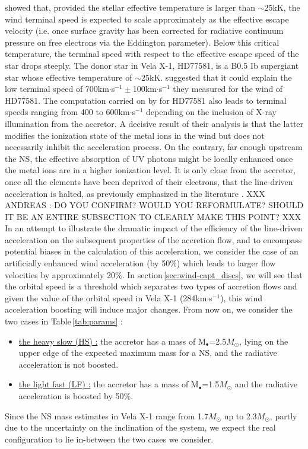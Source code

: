 \documentclass{aa}
\makeatletter
\newcommand*{\ns}{NS\@\xspace}
\newcommand*{\eg}{e.g.\@\xspace}
\newcommand*{\ie}{i.e.\@\xspace}
\newcommand*{\msun}{$M_{\odot}$\@\xspace}
\makeatother
\begin{document}
\cite{Vink2001} showed that, provided the stellar effective temperature is larger than $\sim$25kK, the wind terminal speed is expected to scale approximately as the effective escape velocity (\ie once surface gravity has been corrected for radiative continuum pressure on free electrons via the Eddington parameter). Below this critical temperature, the terminal speed with respect to the effective escape speed of the star drops steeply. The donor star in Vela X-1, HD77581, is a B0.5 Ib supergiant star \citep{Hiltner1972,Forman1973} whose effective temperature of $\sim$25kK. \cite{Gimenez-Garcia2016} suggested that it could explain the low terminal speed of 700km$\cdot$s$^{-1}\pm$100km$\cdot$s$^{-1}$ they measured for the wind of HD77581. The computation carried on by \cite{Sanders2017} for HD77581 also leads to terminal speeds ranging from 400 to 600km$\cdot$s$^{-1}$ depending on the inclusion of X-ray illumination from the accretor. A decisive result of their analysis is that the latter modifies the ionization state of the metal ions in the wind but does not necessarily inhibit the acceleration process. On the contrary, far enough upstream the \ns, the effective absorption of UV photons might be locally enhanced once the metal ions are in a higher ionization level. It is only close from the accretor, once all the elements have been deprived of their electrons, that the line-driven acceleration is halted, as previously emphasized in the literature \citep[see \eg][]{Blondin1990a}. XXX ANDREAS : DO YOU CONFIRM? WOULD YOU REFORMULATE? SHOULD IT BE AN ENTIRE SUBSECTION TO CLEARLY MAKE THIS POINT? XXX In an attempt to illustrate the dramatic impact of the efficiency of the line-driven acceleration on the subsequent properties of the accretion flow, and to encompass potential biases in the calculation of this acceleration, we consider the case of an artificially enhanced wind acceleration (by 50\%) which leads to larger flow velocities by approximately 20\%. In section\,\ref{sec:wind-capt_discs}, we will see that the orbital speed is a threshold which separates two types of accretion flows and given the value of the orbital speed in Vela X-1 (284km$\cdot$s$^{-1}$), this wind acceleration boosting will induce major changes. From now on, we consider the two cases in Table\,\ref{tab:params} :
\begin{itemize}
\item \underline{the heavy slow (HS) :} the accretor has a mass of M$_{\bullet}$=2.5\msun, lying on the upper edge of the expected maximum mass for a \ns, and the radiative acceleration is not boosted.
\item  \underline{the light fast (LF) :} the accretor has a mass of M$_{\bullet}$=1.5\msun and the radiative acceleration is boosted by 50\%.
\end{itemize} 
Since the \ns mass estimates in Vela X-1 range from 1.7\msun \citep{Rawls2011} up to 2.3\msun \citep{Quaintrell2003a}, partly due to the uncertainty on the inclination of the system, we expect the real configuration to lie in-between the two cases we consider.
\end{document}

